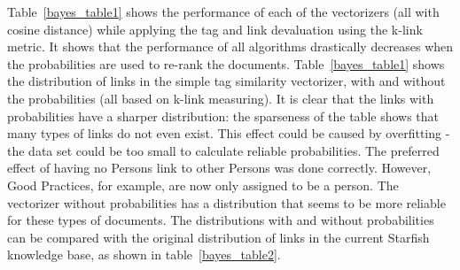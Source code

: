 Table~\ref{bayes_table1} shows the performance of each of the vectorizers (all
with cosine distance) while applying the tag and link devaluation using the
k-link metric. It shows that the performance of all algorithms drastically
decreases when the probabilities are used to re-rank the documents. 
Table~\ref{bayes_table1}  shows the distribution of links in the simple tag
similarity vectorizer, with and without the probabilities (all based on k-link
measuring). It is clear that the links with probabilities have a sharper
distribution: the sparseness of the table shows that many types of links do not
even exist. This effect could be caused by overfitting - the data set could be
too small to calculate reliable probabilities. The preferred effect of having no
Persons link to other Persons was done correctly. However, Good Practices, for
example, are now only assigned to be a person. The vectorizer without
probabilities has a distribution that seems to be more reliable for these types
of documents. The distributions with and without probabilities can be compared
with the original distribution of links in the current Starfish knowledge base,
as shown in table~\ref{bayes_table2}.  

